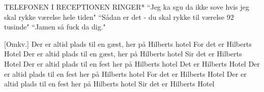 \documentclass[a4paper,11pt]{article}
\begin{document}
\begin{sketch}
    \scene *TELEFONEN I RECEPTIONEN RINGER*
     ``Jeg ka sgu da ikke sove hvis jeg skal rykke værelse hele tiden"
     ``Sådan er det -  du skal rykke til værelse 92 tusinde"
     ``Jamen så fuck da dig."
\end{sketch}
\begin{song}
[Omkv.] Der er altid plads til en gæst, her på Hilberts hotel
For det er Hilberts Hotel
Der er altid plads til en gæst, her på Hilberts hotel
Sir det er Hilberts Hotel
Der er altid plads til en fest her på Hilberts hotel
Det er Hilberts Hotel
Der er altid plads til en fest her på Hilberts hotel
For det er Hilberts Hotel
Der er altid plads til en fest her på Hilberts hotel
Sir det er Hilberts Hotel

\end{song}
\end{document}
